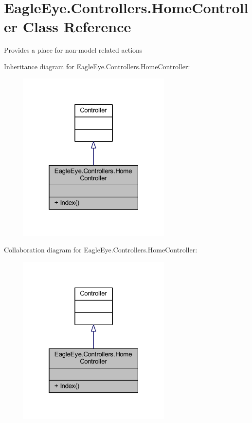\hypertarget{class_eagle_eye_1_1_controllers_1_1_home_controller}{}\section{Eagle\+Eye.\+Controllers.\+Home\+Controller Class Reference}
\label{class_eagle_eye_1_1_controllers_1_1_home_controller}


Provides a place for non-\/model related actions  




Inheritance diagram for Eagle\+Eye.\+Controllers.\+Home\+Controller\+:\nopagebreak
\begin{figure}[H]
\begin{center}
\leavevmode
\includegraphics[width=217pt]{class_eagle_eye_1_1_controllers_1_1_home_controller__inherit__graph}
\end{center}
\end{figure}


Collaboration diagram for Eagle\+Eye.\+Controllers.\+Home\+Controller\+:\nopagebreak
\begin{figure}[H]
\begin{center}
\leavevmode
\includegraphics[width=217pt]{class_eagle_eye_1_1_controllers_1_1_home_controller__coll__graph}
\end{center}
\end{figure}
